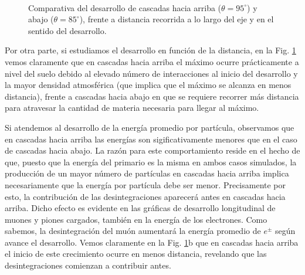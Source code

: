 \documentclass[11 pt, a4paper]{article} %
\numberwithin{equation}{section}
\numberwithin{figure}{section}
\numberwithin{table}{section}
\begin{document}
\begin{figure}[H]
	\centering
	\\
	\caption{Comparativa del desarrollo de cascadas hacia arriba ($\theta = 95^\circ$) y abajo ($\theta=85^\circ$), frente a distancia recorrida a lo largo del eje y en el sentido del desarrollo.}
	\label{comp_ugdg_vsd}
\end{figure}
 Por otra parte, si estudiamos el desarrollo en función de la distancia, en la Fig. \ref{comp_ugdg_vsd} vemos claramente que en cascadas hacia arriba el máximo ocurre prácticamente a nivel del suelo debido al elevado número de interacciones al inicio del desarrollo y la mayor densidad atmosférica (que implica que el máximo se alcanza en menos distancia), frente a cascadas hacia abajo en que se requiere recorrer más distancia para atravesar la cantidad de materia necesaria para llegar al máximo. 

Si atendemos al desarrollo de la energía promedio por partícula, observamos que en cascadas hacia arriba las energías son sigificativamente menores que en el caso de cascadas hacia abajo. La razón para este comportamiento reside en el hecho de que, puesto que la energía del primario es la misma en ambos casos simulados, la producción de un mayor número de partículas en cascadas hacia arriba implica necesariamente que la energía por partícula debe ser menor. Precisamente por esto, la contribución de las desintegraciones aparecerá antes en cascadas hacia arriba. Dicho efecto es evidente en las gráficas de desarrollo longitudinal de muones y piones cargados, también en la energía de los electrones. Como sabemos, la desintegración del muón aumentará la energía promedio de $e^\pm$ según avance el desarrollo. Vemos claramente en la Fig. \ref{comp_ugdg_vsd}b que en cascadas hacia arriba el inicio de este crecimiento ocurre en menos distancia, revelando que las desintegraciones comienzan a contribuir antes.
\end{document}
